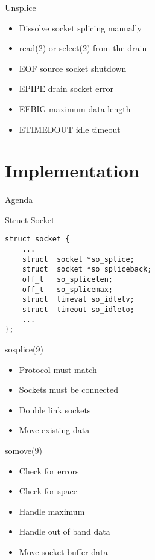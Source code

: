\documentclass[14pt]{beamer}
\begin{document}
\begin{frame}{Unsplice}
\begin{itemize}
    \item Dissolve socket splicing manually
    \item read(2) or select(2) from the drain
    \item EOF source socket shutdown
    \item EPIPE drain socket error
    \item EFBIG maximum data length
    \item ETIMEDOUT idle timeout
\end{itemize}
\end{frame}

\section{Implementation}

\begin{frame}{Agenda}
\tableofcontents[currentsection]
\end{frame}

\begin{frame}[fragile]{Struct Socket}
\begin{verbatim}
struct socket {
    ...
    struct  socket *so_splice;
    struct  socket *so_spliceback;
    off_t   so_splicelen;
    off_t   so_splicemax;
    struct  timeval so_idletv;
    struct  timeout so_idleto;
    ...
};
\end{verbatim}
\end{frame}

\begin{frame}{sosplice(9)}
\begin{itemize}
    \item Protocol must match
    \item Sockets must be connected
    \item Double link sockets
    \item Move existing data
\end{itemize}
\end{frame}

\begin{frame}{somove(9)}
\begin{itemize}
    \item Check for errors
    \item Check for space
    \item Handle maximum
    \item Handle out of band data
    \item Move socket buffer data
\end{itemize}
\end{frame}
\end{document}
